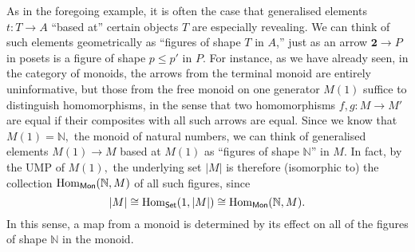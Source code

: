 \example{} As in the foregoing example, it is often the case that generalised elements $t:T\to A$ ``based at'' certain objects $T$ are especially revealing. We can think of such elements geometrically as ``figures of shape $T$ in $A$,'' just as an arrow $\mathbf{2} \to P$ in posets is a figure of shape $p \le p'$ in $P.$ For instance, as we have already seen, in the category of monoids, the arrows from the terminal monoid are entirely uninformative, but those from the free monoid on one generator $M(1)$ suffice to distinguish homomorphisms, in the sense that two homomorphisms $f, g:M \to M'$ are equal if their composites with all such arrows are equal. Since we know that $M(1) = \mathbb{N},$ the monoid of natural numbers, we can think of generalised elements $M(1) \to M$ based at $M(1)$ as ``figures of shape $\mathbb{N}$'' in $M.$ In fact, by the UMP of $M(1),$ the underlying set $|M|$ is therefore (isomorphic to) the collection $\operatorname{Hom}_{\mathsf{Mon}}(\mathbb{N}, M)$ of all such figures, since
\begin{equation*} 
	|M| \cong \operatorname{Hom}_{\mathsf{Set}}(1, |M|) \cong \operatorname{Hom}_{\mathsf{Mon}}(\mathbb{N}, M).
\end{equation*}
In this sense, a map from a monoid is determined by its effect on all of the figures of shape $\mathbb{N}$ in the monoid.
%
%
